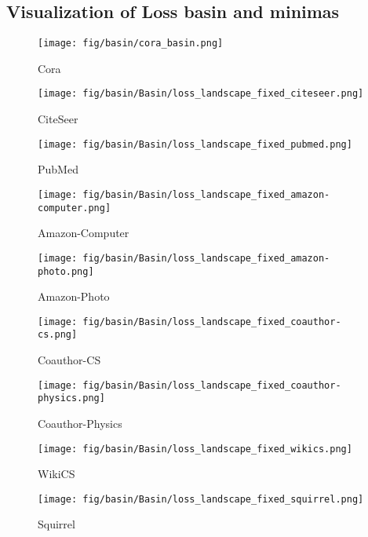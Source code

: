 \subsection{Visualization of Loss basin and minimas }
\begin{figure*}[!ht]
    \centering
    \begin{subfigure}[b]{0.24\textwidth}
        \texttt{[image: fig/basin/cora\_basin.png]}
        \caption{Cora}
    \end{subfigure}
    \begin{subfigure}[b]{0.24\textwidth}
        \texttt{[image: fig/basin/Basin/loss\_landscape\_fixed\_citeseer.png]}
        \caption{CiteSeer}
    \end{subfigure}
    \begin{subfigure}[b]{0.24\textwidth}
        \texttt{[image: fig/basin/Basin/loss\_landscape\_fixed\_pubmed.png]}
        \caption{PubMed}
    \end{subfigure}
    \begin{subfigure}[b]{0.24\textwidth}
        \texttt{[image: fig/basin/Basin/loss\_landscape\_fixed\_amazon-computer.png]}
        \caption{Amazon-Computer}
    \end{subfigure}
    \begin{subfigure}[b]{0.24\textwidth}
        \texttt{[image: fig/basin/Basin/loss\_landscape\_fixed\_amazon-photo.png]}
        \caption{Amazon-Photo}
    \end{subfigure}
    \begin{subfigure}[b]{0.24\textwidth}
        \texttt{[image: fig/basin/Basin/loss\_landscape\_fixed\_coauthor-cs.png]}
        \caption{Coauthor-CS}
    \end{subfigure}
    \begin{subfigure}[b]{0.24\textwidth}
        \texttt{[image: fig/basin/Basin/loss\_landscape\_fixed\_coauthor-physics.png]}
        \caption{Coauthor-Physics}
    \end{subfigure}
    \begin{subfigure}[b]{0.24\textwidth}
        \texttt{[image: fig/basin/Basin/loss\_landscape\_fixed\_wikics.png]}
        \caption{WikiCS}
    \end{subfigure}
    \begin{subfigure}[b]{0.24\textwidth}
        \texttt{[image: fig/basin/Basin/loss\_landscape\_fixed\_squirrel.png]}
        \caption{Squirrel}

\end{subfigure}
\end{figure*}
